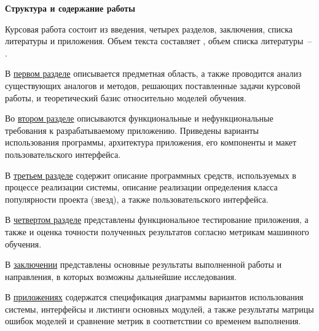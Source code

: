 \vspace{0.5em}
\textbf{Структура и содержание работы}

Курсовая работа состоит из введения, четырех разделов, заключения, списка литературы и приложения. Объем текста составляет , объем списка литературы~-- .

В \hyperref[sec:Background]{первом разделе} описывается предметная область, а также проводится анализ существующих аналогов и методов, решающих поставленные задачи курсовой работы, и теоретический базис относительно моделей обучения.

Во \hyperref[sec:Design]{втором разделе} описываются функциональные и нефункциональные требования к разрабатываемому приложению. Приведены варианты использования программы, архитектура приложения, его компоненты и макет пользовательского интерфейса.

В \hyperref[sec:Realization]{третьем разделе} содержит описание программных средств, используемых в процессе реализации системы, описание реализации определения класса популярности проекта (звезд), а также пользовательского интерфейса.

В \hyperref[sec:Testings]{четвертом разделе} представлены функциональное тестирование приложения, а также и оценка точности полученных результатов согласно метрикам машинного обучения.

В \hyperref[sec:Conclusion]{заключении} представлены основные результаты выполненной работы и направления, в которых возможны дальнейшие исследования.

В \hyperref[sec:Appendix]{приложениях} содержатся спецификация диаграммы вариантов использования системы, интерфейсы и листинги основных модулей, а также результаты матрицы ошибок моделей и сравнение метрик в соответствии со временем выполнения.
